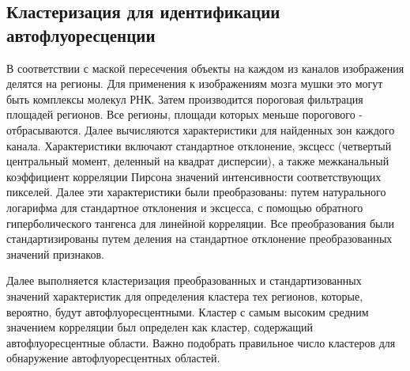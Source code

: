 \begin{algorithm} [H]
\nonl{}
\label{alg:AlgoFDSCALING}
\end{algorithm} 




	
\subsection{Кластеризация для идентификации автофлуоресценции} \label{ch2:sec-very-short-title} %
В соответствии с маской пересечения объекты на каждом из каналов изображения делятся на регионы. Для применения к изображениям мозга мушки это могут быть комплексы молекул РНК. Затем производится пороговая фильтрация площадей регионов. Все регионы, площади которых меньше порогового - отбрасываются. Далее вычисляются характеристики для найденных зон каждого канала. Характеристики включают стандартное отклонение, эксцесс (четвертый центральный момент, деленный на квадрат дисперсии), а также межканальный коэффициент корреляции Пирсона значений интенсивности соответствующих пикселей. Далее эти характеристики были преобразованы: путем натурального логарифма для стандартное отклонения и эксцесса, с помощью обратного гиперболического тангенса для линейной корреляции. Все преобразования были стандартизированы путем деления на стандартное отклонение преобразованных значений признаков.

Далее выполняется кластеризация преобразованных и стандартизованных значений характеристик для определения кластера тех регионов, которые, вероятно, будут автофлуоресцентными. Кластер с самым
высоким средним значением корреляции был определен как кластер, содержащий автофлуоресцентные
области. Важно подобрать правильное число кластеров для обнаружение автофлуоресцентных областей.

